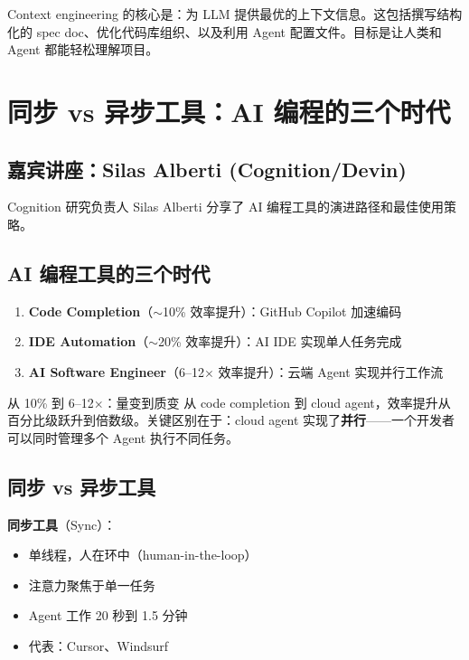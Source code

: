 \documentclass[a4paper]{article}
\begin{document}
Context engineering 的核心是：为 LLM 提供最优的上下文信息。这包括撰写结构化的 spec doc、优化代码库组织、以及利用 Agent 配置文件。目标是让人类和 Agent 都能轻松理解项目。

\section{同步 vs 异步工具：AI 编程的三个时代}

\subsection{嘉宾讲座：Silas Alberti (Cognition/Devin)}

Cognition 研究负责人 Silas Alberti 分享了 AI 编程工具的演进路径和最佳使用策略。

\subsection{AI 编程工具的三个时代}

\begin{enumerate}
    \item \textbf{Code Completion}（$\sim$10\% 效率提升）：GitHub Copilot 加速编码
    \item \textbf{IDE Automation}（$\sim$20\% 效率提升）：AI IDE 实现单人任务完成
    \item \textbf{AI Software Engineer}（6--12$\times$ 效率提升）：云端 Agent 实现并行工作流
\end{enumerate}

\begin{importantbox}{从 10\% 到 6--12$\times$：量变到质变}
从 code completion 到 cloud agent，效率提升从百分比级跃升到倍数级。关键区别在于：cloud agent 实现了\textbf{并行}——一个开发者可以同时管理多个 Agent 执行不同任务。
\end{importantbox}

\subsection{同步 vs 异步工具}

\textbf{同步工具}（Sync）：
\begin{itemize}
    \item 单线程，人在环中（human-in-the-loop）
    \item 注意力聚焦于单一任务
    \item Agent 工作 20 秒到 1.5 分钟
    \item 代表：Cursor、Windsurf
\end{itemize}
\end{document}
